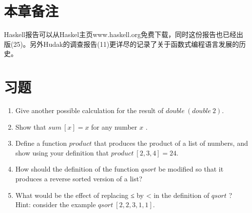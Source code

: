 \section{本章备注}
Haskell报告可以从Haskel主页www.haskell.org免费下载，同时这份报告也已经出版(25)。另外Hudak的调查报告(11)更详尽的记录了关于函数式编程语言发展的历史。 

\section{习题}
\begin{enumerate}
\item Give another possible calculation for the result of $double~(double~2)$.
\item Show that $sum~[ x ] = x$ for any number $x$ .
\item Define a function $product$ that produces the product of a list of
numbers, and show using your definition that $product~[2, 3, 4] = 24$.
\item How should the definition of the function $qsort$ be modified so that it produces a reverse sorted version of a list?
\item What would be the effect of replacing ≤ by < in the definition of
$qsort$ ?\\ Hint: consider the example $qsort~[2, 2, 3, 1, 1]$.
\end{enumerate}

